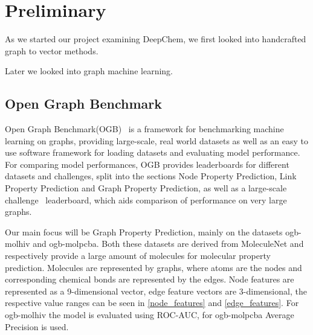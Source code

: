 \section{Preliminary}

As we started our project examining DeepChem, we first looked into handcrafted graph to vector methods.

Later we looked into graph machine learning.

\subsection{Open Graph Benchmark}
Open Graph Benchmark(OGB)~\cite{2021ogb} is a framework for benchmarking machine learning on graphs, providing large-scale, real world datasets as well as an easy to use software framework for loading  datasets and evaluating model performance.
For comparing model performances, OGB provides leaderboards for different datasets and challenges, split into the sections Node Property Prediction, Link Property Prediction and Graph Property Prediction, as well as a large-scale challenge~\cite{hu2021ogblsc} leaderboard, which aids comparison of performance on very large graphs.

Our main focus will be Graph Property Prediction, mainly on the datasets ogb-molhiv and ogb-molpcba. Both these datasets are derived from MoleculeNet and respectively provide a large amount of molecules for molecular property prediction. Molecules are represented by graphs, where atoms are the nodes and corresponding chemical bonds are represented by the edges. Node features are represented as a 9-dimensional vector, edge feature vectors are 3-dimensional, the respective value ranges can be seen in \autoref{node_features} and \autoref{edge_features}.
For ogb-molhiv the model is evaluated using ROC-AUC, for ogb-molpcba Average Precision is used.


